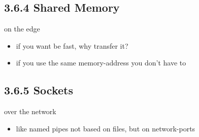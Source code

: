 \documentclass[hyperref={pdfpagelabels=false}]{beamer}
\begin{document}
    \subsection{3.6.4 Shared Memory}
    \begin{frame}{on the edge}
        \begin{itemize}
            \item<1-> if you want be fast, why transfer it?
            \item<2-> if you use the same memory-address you don't have to
        \end{itemize}
    \end{frame}
    \subsection{3.6.5 Sockets}
    \begin{frame}{over the network}
        \begin{itemize}
            \item<1-> like named pipes not based on files, but on network-ports
        \end{itemize}
    \end{frame}

    
\end{document}
